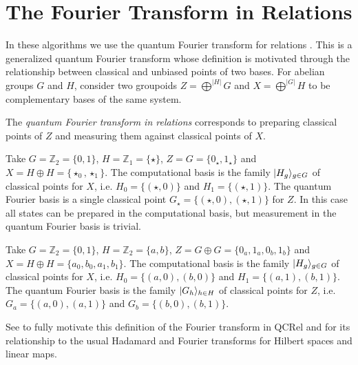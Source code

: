 \section{The Fourier Transform in Relations}
\label{sec:FT}

In these algorithms we use the quantum Fourier transform for relations \cite{strongCompFT}. This is a generalized quantum Fourier transform whose definition is motivated through the relationship between classical and unbiased points of two bases.  For abelian groups $G$ and $H$, consider two groupoids $Z=\bigoplus^{|H|}G$ and $X=\bigoplus^{|G|}H$ to be complementary bases of the same system.

\begin{defn}
\label{def:FTRel}
The \emph{quantum Fourier transform in relations} corresponds to preparing classical points of $Z$ and measuring them against classical points of $X$.
\end{defn}

\begin{example}
Take $G=\mathbb{Z}_2=\{0,1\}$, $H=\mathbb{Z}_1=\{\star\}$, $Z = G = \{ 0_\star,1_\star \}$ and $X=H\oplus H = \{ \star_0,\star_1 \}$. The computational basis is the family $| H_g \rangle_{g\in G}$ of classical points for $X$, i.e. $H_0 = \{(\star,0)\}$ and $H_1 = \{(\star,1)\}$. The quantum Fourier basis is a single classical point $G_\star = \{(\star,0), (\star,1)\}$ for $Z$. In this case all states can be prepared in the computational basis, but  measurement in the quantum Fourier basis is trivial.
\end{example}

\begin{example}
Take $G=\mathbb{Z}_2=\{0,1\}$, $H=\mathbb{Z}_2=\{a,b\}$, $Z = G \oplus G = \{ 0_a,1_a,0_b,1_b\}$ and $X= H \oplus H = \{ a_0, b_0, a_1, b_1 \}$. The computational basis is the family $| H_g \rangle_{g \in G}$ of classical points for $X$, i.e. $H_0 = \{(a,0),(b,0)\}$ and $H_1 = \{(a,1),(b,1)\}$. The quantum Fourier basis is the family $| G_h \rangle_{h\in H}$ of classical points for $Z$, i.e. $G_a = \{(a,0),(a,1)\}$ and $G_b = \{(b,0),(b,1)\}$.
\end{example}

See \cite{strongCompFT} to fully motivate this definition of the Fourier transform in QCRel and for its relationship to the usual Hadamard and Fourier transforms for Hilbert spaces and linear maps.

